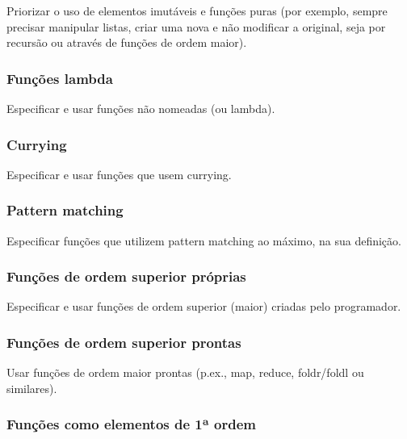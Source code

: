 \documentclass[rel_mlp]{iiufrgs}
\begin{document}
Priorizar o uso de elementos imutáveis e funções puras (por exemplo, sempre precisar manipular listas, criar uma nova e não modificar a original, seja por recursão ou através de funções de ordem maior).


\subsubsection{Funções lambda}

Especificar e usar funções não nomeadas (ou lambda).


\subsubsection{Currying}

Especificar e usar funções que usem currying.


\subsubsection{Pattern matching}

Especificar funções que utilizem pattern matching ao máximo, na sua definição.


\subsubsection{Funções de ordem superior próprias}

Especificar e usar funções de ordem superior (maior) criadas pelo programador.


\subsubsection{Funções de ordem superior prontas}

Usar funções de ordem maior prontas (p.ex., map, reduce, foldr/foldl ou similares).


\subsubsection{Funções como elementos de 1ª ordem}
\end{document}
